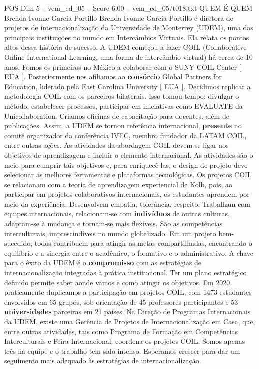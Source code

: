 \begin{textsample}{POS Dim 5 – vem\_ed\_05 – Score 6.00 – vem\_ed\_05/t018.txt}  \label{ex:f5_pos_069}
QUEM É QUEM Brenda Ivonne Garcia Portillo Brenda Ivonne Garcia Portillo é diretora de projetos de internacionalização da Universidade de Monterrey (UDEM), uma das principais instituições no mundo em Intercâmbios Virtuais.
Ela relata os pontos altos dessa história de sucesso.
A UDEM começou a fazer COIL (Collaborative Online International Learning, uma forma de intercâmbio virtual) há cerca de 10 anos.
Fomos os primeiros no México a colaborar com o SUNY COIL Center [ EUA ].
Posteriormente nos afiliamos ao \textbf{consórcio} Global Partners for Education, liderado pela East Carolina University [ EUA ].
Decidimos replicar a metodologia COIL com os parceiros bilaterais.
Isso tomou tempo: divulgar o método, estabelecer processos, participar em iniciativas como EVALUATE da Unicollaboration.
Criamos oficinas de capacitação para docentes, além de publicações.
Assim, a UDEM se tornou referência internacional, \textbf{presente} no comitê organizador da conferência IVEC, membro fundador da LATAM COIL, entre outras ações.
As atividades da abordagem COIL devem se ligar aos objetivos de aprendizagem e incluir o elemento internacional.
As atividades são o meio para cumprir tais objetivos e, para enriquecê-las, o design de projeto deve selecionar as melhores ferramentas e plataformas tecnológicas.
Os projetos COIL se relacionam com a teoria de aprendizagem experiencial de Kolb, pois, ao participar em projetos colaborativos internacionais, os estudantes aprendem por meio da experiência.
Desenvolvem empatia, tolerância, respeito.
Trabalham com equipes internacionais, relacionam-se com \textbf{indivíduos} de outras culturas, adaptam-se à mudança e tornam-se mais flexíveis.
São as competências interculturais, imprescindíveis no mundo globalizado.
Em um projeto bem-sucedido, todos contribuem para atingir as metas compartilhadas, encontrando o equilíbrio e a sinergia entre o acadêmico, o formativo e o administrativo.
A chave para o êxito da UDEM é o \textbf{compromisso} com as estratégias de internacionalização integradas à prática institucional.
Ter um plano estratégico definido permite saber aonde vamos e como atingir os objetivos.
Em 2020 praticamente duplicamos a participação em projetos COIL, com 1473 estudantes envolvidos em 65 grupos, sob orientação de 45 professores participantes e 53 \textbf{universidades} parceiras em 21 países.
Na Direção de Programas Internacionais da UDEM, existe uma Gerência de Projetos de Internacionalização em Casa, que, entre outras atividades, tais como Programa de Formação em Competências Interculturais e Feira Internacional, coordena os projetos COIL.
Somos apenas três na equipe e o trabalho tem sido intenso.
Esperamos crescer para dar um seguimento mais adequado às estratégias de internacionalização.

\end{textsample}
